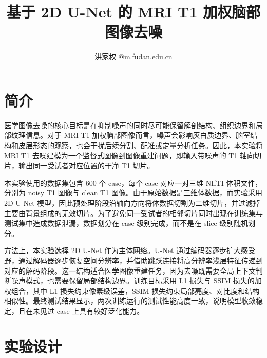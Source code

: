 \documentclass[UTF8,a4paper,12pt]{ctexart}
\title{基于 2D U-Net 的 MRI T1 加权脑部图像去噪}
\author{洪家权 \quad 23307110248@m.fudan.edu.cn}
\date{}
\begin{document}
\maketitle


\section{简介}

医学图像去噪的核心目标是在抑制噪声的同时尽可能保留解剖结构、组织边界和局部纹理信息。对于 MRI T1 加权脑部图像而言，噪声会影响灰白质边界、脑室结构和皮层形态的观察，也会干扰后续分割、配准或定量分析任务。因此，本实验将 MRI T1 去噪建模为一个监督式图像到图像重建问题，即输入带噪声的 T1 轴向切片，输出同一受试者对应位置的干净 T1 切片。

本实验使用的数据集包含 600 个 case，每个 case 对应一对三维 NIfTI 体积文件，分别为 noisy T1 图像与 clean T1 图像。由于原始数据是三维体数据，而实验采用 2D U-Net 模型，因此预处理阶段沿轴向方向将体数据切割为二维切片，并过滤掉主要由背景组成的无效切片。为了避免同一受试者的相邻切片同时出现在训练集与测试集中造成数据泄漏，数据划分在 case 级别完成，而不是在 slice 级别随机划分。

方法上，本实验选择 2D U-Net 作为主体网络。U-Net 通过编码器逐步扩大感受野，通过解码器逐步恢复空间分辨率，并借助跳跃连接将高分辨率浅层特征传递到对应的解码阶段。这一结构适合医学图像重建任务，因为去噪既需要全局上下文判断噪声模式，也需要保留局部结构边界。训练目标采用 L1 损失与 SSIM 损失的加权组合，其中 L1 损失约束像素级误差，SSIM 损失约束局部亮度、对比度和结构相似性。最终测试结果显示，两次训练运行的测试性能高度一致，说明模型收敛稳定，且在未见过 case 上具有较好泛化能力。

\section{实验设计}
\end{document}
